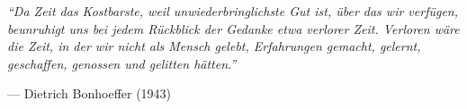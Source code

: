 \emph{``Da Zeit das Kostbarste,
weil unwiederbringlichste Gut ist,
über das wir verfügen,
beunruhigt uns bei jedem Rückblick
der Gedanke etwa verlorer Zeit.
Verloren wäre die Zeit,
in der wir nicht als Mensch gelebt,
Erfahrungen gemacht,
gelernt, geschaffen, genossen
und gelitten hätten.''}

--- Dietrich Bonhoeffer (1943)